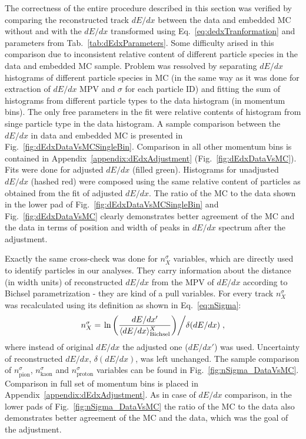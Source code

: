 The correctness of the entire procedure described in this section was verified by comparing the reconstructed track $dE/dx$ between the data and embedded MC without and with the $dE/dx$ transformed using Eq.~\eqref{eq:dedxTranformation} and parameters from Tab.~\ref{tab:dEdxParameters}. Some difficulty arised in this comparison due to inconsistent relative content of different particle species in the data and embedded MC sample. Problem was ressolved by separating $dE/dx$ histograms of different particle species in MC (in the same way as it was done for extraction of $dE/dx$ MPV and $\sigma$ for each particle ID) and fitting the sum of histograms from different particle types to the data histogram (in momentum bins). The only free parameters in the fit were relative contents of histogram from singe particle type in the data histogram. A sample comparison between the $dE/dx$ in data and embedded MC is presented in Fig.~\ref{fig:dEdxDataVsMCSingleBin}. Comparison in all other momentum bins is contained in Appendix~\ref{appendix:dEdxAdjustment} (Fig.~\ref{fig:dEdxDataVsMC}). Fits were done for adjusted $dE/dx$ (filled green). Histograms for unadjusted $dE/dx$ (hashed red) were composed using the same relative content of particles as obtained from the fit of adjusted $dE/dx$. The ratio of the MC to the data shown in the lower pad of Fig.~\ref{fig:dEdxDataVsMCSingleBin} and Fig.~\ref{fig:dEdxDataVsMC} clearly demonstrates better agreement of the MC and the data in terms of position and width of peaks in $dE/dx$ spectrum after the adjustment.

Exactly the same cross-check was done for $n^{\sigma}_{X}$ variables, which are directly used to identify particles in our analyses. They carry information about the distance (in width units) of reconstructed $dE/dx$ from the MPV of $dE/dx$ according to Bichsel parametrization - they are kind of a pull variables. For every track $n^{\sigma}_{X}$ was recalculated using its definition as shown in Eq.~\eqref{eq:nSigma}:
\begin{equation}\label{eq:nSigma}%
 n^{\sigma}_{X} = \left. \ln{\left(\frac{dE/dx'}{\langle dE/dx\rangle_{\textrm{Bichsel}}^{X}}\right)} \middle/ \delta(dE/dx) \right.,
\end{equation}
where instead of original $dE/dx$ the adjusted one ($dE/dx'$) was used. Uncertainty of reconstructed $dE/dx$, $\delta(dE/dx)$, was left unchanged. The sample comparison of $n^{\sigma}_{\text{pion}}$, $n^{\sigma}_{\text{kaon}}$ and $n^{\sigma}_{\text{proton}}$ variables can be found in Fig.~\ref{fig:nSigma_DataVsMC}. Comparison in full set of momentum bins is placed in Appendix~\ref{appendix:dEdxAdjustment}. As in case of $dE/dx$ comparison, in the lower pads of Fig.~\ref{fig:nSigma_DataVsMC} the ratio of the MC to the data also demonstrates better agreement of the MC and the data, which was the goal of the adjustment.

